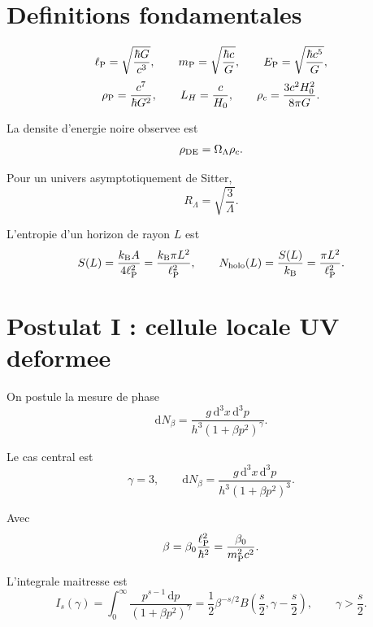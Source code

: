 \documentclass[11pt,a4paper]{article}
\newcommand{\lp}{\ell_{\rm P}}
\newcommand{\rp}{\rho_{\rm P}}
\newcommand{\rhc}{\rho_c}
\newcommand{\mpl}{m_{\rm P}}
\newcommand{\Ep}{E_{\rm P}}
\newcommand{\RL}{R_\Lambda}
\newcommand{\LH}{L_H}
\newcommand{\kb}{k_{\rm B}}
\newcommand{\dif}{\mathrm d}
\begin{document}
\section{Definitions fondamentales}

\begin{equation}
\lp=\sqrt{\frac{\hbar G}{c^3}},
\qquad
\mpl=\sqrt{\frac{\hbar c}{G}},
\qquad
\Ep=\sqrt{\frac{\hbar c^5}{G}},
\end{equation}
\begin{equation}
\rp=\frac{c^7}{\hbar G^2},
\qquad
\LH=\frac{c}{H_0},
\qquad
\rhc=\frac{3c^2H_0^2}{8\pi G}.
\end{equation}

La densite d'energie noire observee est
\begin{equation}
\rho_{\rm DE}=\Omega_\Lambda \rhc.
\end{equation}

Pour un univers asymptotiquement de Sitter,
\begin{equation}
\RL=\sqrt{\frac{3}{\Lambda}}.
\end{equation}

L'entropie d'un horizon de rayon \(L\) est
\begin{equation}
S(L)=\frac{\kb A}{4\lp^2}=\frac{\kb\pi L^2}{\lp^2},
\qquad
N_{\rm holo}(L)=\frac{S(L)}{\kb}=\frac{\pi L^2}{\lp^2}.
\end{equation}

\section{Postulat I : cellule locale UV deformee}

On postule la mesure de phase
\begin{equation}
\boxed{
\dif N_\beta=
\frac{g\,\dif^3x\,\dif^3p}{h^3(1+\beta p^2)^\gamma}.
}
\end{equation}

Le cas central est
\begin{equation}
\boxed{
\gamma=3,
\qquad
\dif N_\beta=
\frac{g\,\dif^3x\,\dif^3p}{h^3(1+\beta p^2)^3}.
}
\end{equation}

Avec
\begin{equation}
\beta=\beta_0\frac{\lp^2}{\hbar^2}
=\frac{\beta_0}{\mpl^2c^2}.
\end{equation}

L'integrale maitresse est
\begin{equation}
I_s(\gamma)=\int_0^\infty \frac{p^{s-1}\,\dif p}{(1+\beta p^2)^\gamma}
=\frac12\beta^{-s/2}B\left(\frac{s}{2},\gamma-\frac{s}{2}\right),
\qquad \gamma>\frac{s}{2}.
\end{equation}
\end{document}
